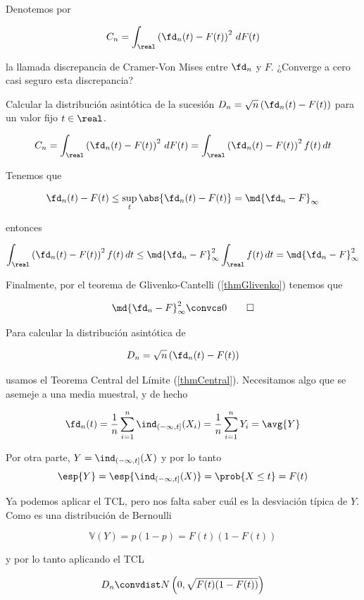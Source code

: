 \begin{problem}[4] Denotemos por 

\[ C_n = \int_\real \left(\fd_n(t) - F(t)\right)^2 \, dF(t) \]

la llamada discrepancia de Cramer-Von Mises entre $\fd_n$ y $F$. \ppart ¿Converge a cero casi seguro esta discrepancia?

\ppart Calcular la distribución asintótica de la sucesión $D_n = \sqrt{n}\left(\fd_n(t) - F(t)\right)$ para un valor fijo $t\in\real$.

\solution
\spart 
\[ C_n = \int_\real \left(\fd_n(t) - F(t)\right)^2 \, dF(t) = \int_\real \left(\fd_n(t) - F(t)\right)^2 f(t) \, dt \]

Tenemos que 

\[ \fd_n(t) - F(t) \leq \sup_t \abs{\fd_n(t) - F(t)} = \md{\fd_n - F}_\infty \]

entonces 

\[ \int_\real \left(\fd_n(t) - F(t)\right)^2 f(t) \, dt \leq \md{\fd_n - F}_\infty^2 \int_\real f(t) \,dt = \md{\fd_n - F}_\infty^2 \]

Finalmente, por el teorema de Glivenko-Cantelli (\ref{thmGlivenko}) tenemos que 

\[ \md{\fd_n - F}_\infty^2 \convcs 0  \qed \]

\spart

Para calcular la distribución asintótica de

\[ D_n = \sqrt{n}\left(\fd_n(t) - F(t)\right) \]

usamos el Teorema Central del Límite (\ref{thmCentral}). Necesitamos algo que se asemeje a una media muestral, y de hecho

\[
\fd_n(t) =
\frac{1}{n} \sum_{i=1}^n \ind_{(-\infty, t]} (X_i) =
\frac{1}{n} \sum_{i=1}^n Y_i =
\avg{Y}
\]

Por otra parte, $Y = \ind_{(-\infty, t]}(X)$ y por lo tanto \[ \esp{Y} = \esp{\ind_{(-\infty, t]}(X)} = \prob{X \leq t} = F(t) \]

Ya podemos aplicar el TCL, pero nos falta saber cuál es la desviación típica de $Y$. Como es una distribución de Bernoulli 

\[ \mathbb{V}(Y) = p(1-p) = F(t)(1-F(t)) \]

y por lo tanto aplicando el TCL

\[ D_n \convdist N\left(0, \sqrt{F(t)(1-F(t))}\right) \]
\end{problem}


